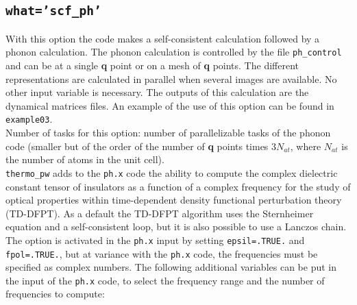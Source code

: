 \documentclass[12pt,a4paper]{article}
\begin{document}
\subsection{\color{web-blue}\texttt{what='scf\_ph'}}
With this option the code makes a self-consistent calculation followed
by a phonon calculation. The phonon calculation is controlled by the file
\texttt{ph\_control} and can be at a single {\bf q} point or on a mesh of 
{\bf q} points. 
The different representations are calculated in parallel when several images 
are available. No other input variable is necessary. The outputs of this 
calculation are the dynamical matrices files.
An example of the use of this option can be found in \texttt{example03}. \\
Number of tasks for this option: number of parallelizable tasks of the 
phonon code (smaller but of the order of the number of {\bf q} points times 
$3 N_{at}$, where $N_{at}$ is the number of atoms in the unit cell). \\
\texttt{thermo\_pw} adds to the \texttt{ph.x} code the ability to
compute the complex dielectric constant tensor of insulators as a function 
of a complex frequency for the study of optical properties within 
time-dependent density functional perturbation theory (TD-DFPT). 
As a default the TD-DFPT algorithm uses the Sternheimer equation and 
a self-consistent loop, but it is also possible to use a Lanczos chain.
The option is activated in the \texttt{ph.x} input by setting 
\texttt{epsil=.TRUE.} and \texttt{fpol=.TRUE.}, but at variance with
the \texttt{ph.x} code, the frequencies must be specified as complex numbers.
The following additional variables can be put in the input of the \texttt{ph.x}
code, to select the frequency range and the number of frequencies to compute:
\end{document}

